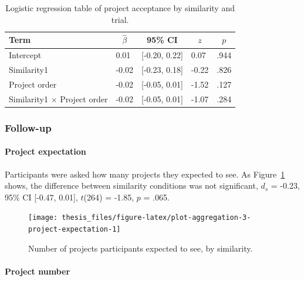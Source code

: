 \documentclass[a4paper, nobind, dvipsnames]{templates/ociamthesis}
\theoremstyle{definition}
\theoremstyle{definition}
\theoremstyle{definition}
\theoremstyle{definition}
\theoremstyle{remark}
\begin{document}
\begin{table}[tbp]

\begin{center}
\begin{threeparttable}

\caption{\label{tab:similarity-project-order}Logistic regression table of project acceptance by similarity and trial.}

\begin{tabular}{lllll}
\toprule
Term & \multicolumn{1}{c}{$\hat{\beta}$} & \multicolumn{1}{c}{95\% CI} & \multicolumn{1}{c}{$z$} & \multicolumn{1}{c}{$p$}\\
\midrule
Intercept & 0.01 & {}[-0.20, 0.22] & 0.07 & .944\\
Similarity1 & -0.02 & {}[-0.23, 0.18] & -0.22 & .826\\
Project order & -0.02 & {}[-0.05, 0.01] & -1.52 & .127\\
Similarity1 $\times$ Project order & -0.02 & {}[-0.05, 0.01] & -1.07 & .284\\
\bottomrule
\end{tabular}

\end{threeparttable}
\end{center}

\end{table}

\subsubsection{Follow-up}

\paragraph{Project expectation}

Participants were asked how many projects they expected to see. As
Figure~\ref{fig:plot-aggregation-3-project-expectation} shows, the difference
between similarity conditions was not significant,
\(d_s\) = -0.23, 95\% CI {[}-0.47, 0.01{]}, \(t\)(264) = -1.85, \(p\) = .065.



\begin{figure}
\texttt{[image: thesis\_files/figure-latex/plot-aggregation-3-project-expectation-1]} \caption{Number of projects participants expected to see, by similarity.}\label{fig:plot-aggregation-3-project-expectation}
\end{figure}

\paragraph{Project number}
\end{document}
